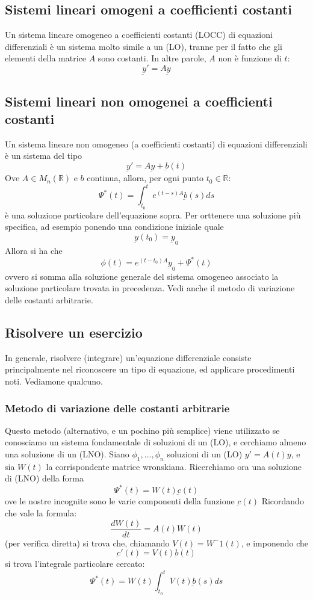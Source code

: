 \documentclass[a4paper,12pt]{article}
\begin{document}
\subsection{Sistemi lineari omogeni a coefficienti costanti}
Un sistema lineare omogeneo a coefficienti costanti (LOCC) di equazioni differenziali è un sistema molto simile a un (LO), tranne per il fatto che gli elementi della matrice $A$ sono costanti. In altre parole, $A$ non è funzione di $t$:
$$\underbar{y}' = A\underbar{y}$$

\subsection{Sistemi lineari non omogenei a coefficienti costanti}
Un sistema lineare non omogeneo (a coefficienti costanti) di equazioni differenziali è un sistema del tipo
$$\underbar{y}'=A\underbar{y}+\underbar{b}(t)$$
Ove $A\in M_n(\mathbb{R})$ e $b$ continua, allora, per ogni punto $t_0 \in \mathbb{R}$:
$$\Psi^*(t)= \int_{t_0}^t e^{(t-s)A} \underbar{b}(s)ds$$
è una soluzione particolare dell'equazione sopra.
Per orttenere una soluzione più specifica, ad esempio ponendo una condizione iniziale quale
$$\underbar{y}(t_0)=\underbar{y}_0$$
Allora si ha che
$$\phi(t)=e^{(t-t_0)A}\underbar{y}_0+\Psi^*(t)$$
ovvero si somma alla soluzione generale del sistema omogeneo associato la soluzione particolare trovata in precedenza.
Vedi anche il metodo di variazione delle costanti arbitrarie.

\subsection{Risolvere un esercizio}
In generale, risolvere (integrare) un'equazione differenziale consiste principalmente nel riconoscere un tipo di equazione, ed applicare procedimenti noti. Vediamone qualcuno.

\subsubsection{Metodo di variazione delle costanti arbitrarie}
Questo metodo (alternativo, e un pochino più semplice) viene utilizzato se conosciamo un sistema fondamentale di soluzioni di un (LO), e cerchiamo almeno una soluzione di un (LNO).
Siano $\phi_1,...,\phi_n$ soluzioni di un (LO) $y'= A(t)y$, e sia $W(t)$ la corrispondente matrice wronskiana.
Ricerchiamo ora una soluzione di (LNO) della forma
$$\Psi^*(t)=W(t)\underbar{c}(t)$$
ove le nostre incognite sono le varie componenti della funzione $\underbar{c}(t)$
Ricordando che vale la formula:
$$\frac{dW(t)}{dt} = A(t)W(t)$$
(per verifica diretta) si trova che, chiamando $V(t) = W^-1(t)$, e imponendo che $$\underbar{c}'(t) = V(t)\underbar{b}(t)$$
si trova l'integrale particolare cercato:
$$\Psi^*(t)= W(t)\int_{t_0}^t V(t)\underbar{b}(s) ds$$
\end{document}
